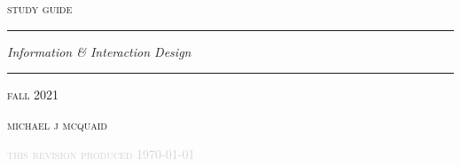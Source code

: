 
\begin{center}

  \textsf{\MakeUppercase{}}

\smallskip

\textsf{\MakeUppercase{}}

\smallskip

\textsf{\MakeUppercase{}}

\end{center}

\setlength{\cslhangindent}{1.5em}
\newlength{\csllabelwidth}
\setlength{\csllabelwidth}{3em}
\newenvironment{CSLReferences}[2] %
 {%
  \setlength{\parindent}{0pt}
  \ifodd #1 \everypar{\setlength{\hangindent}{\cslhangindent}}\ignorespaces\fi
  \ifnum #2 > 0
  \setlength{\parskip}{#2\baselineskip}
  \fi
 }%
 {}
\newcommand{\CSLBlock}[1]{#1\hfill\break}
\newcommand{\CSLLeftMargin}[1]{\parbox[t]{\maxof{\widthof{#1}}{\csllabelwidth}}{#1}}
\newcommand{\CSLRightInline}[1]{\parbox[t]{\linewidth}{#1}}
\newcommand{\CSLIndent}[1]{\hspace{\cslhangindent}#1}

\thispagestyle{empty}
\setlength{\emergencystretch}{2em}
\begin{center}

\hrulefill

\vskip48pt

\textsc{study guide}

\vskip6pt

\rule{196pt}{0.5pt}

\vskip12pt

{\large \textcolor[rgb]{0.0,0.2,0.35}{\it Information \& Interaction Design}}

\vskip6pt

\rule{196pt}{0.5pt}

\vskip12pt

\textsc{fall 2021}

\vskip148pt


\textsc{michael j m{\scriptsize c}quaid}

\vskip24pt

{\large {}}

\vskip18pt

\textcolor{lightgray}{\textsc{this revision produced \MakeLowercase{\today}}}

\vskip18pt

\hrulefill

\end{center}
\thispagestyle{empty}
\pagebreak

